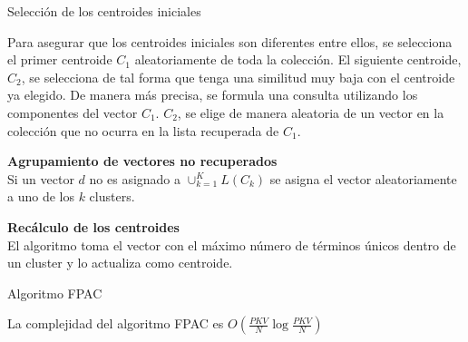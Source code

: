 \begin{frame}{Selección de los centroides
iniciales}

Para asegurar que los centroides iniciales
son diferentes entre ellos, se selecciona el 
primer centroide $C_1$ aleatoriamente de toda
la colección. El siguiente centroide, $C_2$, 
se selecciona de tal forma que tenga una 
similitud muy baja con el centroide ya 
elegido. De manera más precisa, se formula 
una consulta utilizando 
los componentes del vector $C_1$.
$C_2$, se elige de manera aleatoria de un vector en la colección que no ocurra en la lista recuperada de $C_1$.
\end{frame}
\begin{frame}
\textbf{Agrupamiento de vectores no recuperados\\} 
Si un vector $d$ no es asignado a $\cup_{k=1}^K L(C_k)$ se asigna el vector
aleatoriamente a uno de los $k$ clusters.

\textbf{Recálculo de los centroides\\}
El algoritmo toma el vector con el máximo número de términos únicos dentro de un
cluster y lo actualiza como centroide.
\end{frame}


\begin{frame}{Algoritmo FPAC}

La complejidad del algoritmo FPAC es $O(\frac{PKV}{N} \log \frac{PKV}{N})$
\end{frame}
